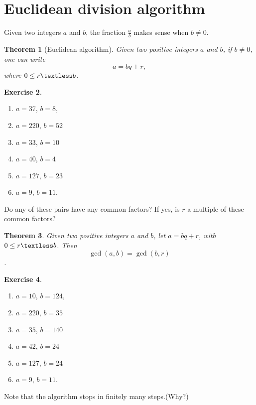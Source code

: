 \documentclass[12pt]{amsart}
\newtheorem{theorem}{Theorem}[section]
\theoremstyle{definition}
\newtheorem{xca}[theorem]{Exercise}
\theoremstyle{remark}
\numberwithin{equation}{section}
\begin{document}
\section{Euclidean division algorithm}

Given two integers $a$ and $b$, the fraction $\frac{a}{b}$ makes sense when $b\neq 0$. 
\begin{theorem}[Euclidean algorithm]
Given two positive integers $a$ and $b$, if $b\neq 0$, one can write  \[ a=bq+r,\] where $0\leq r\textless b$.
\end{theorem}
\begin{xca}
\begin{enumerate} Practice at using the algorithm for the following set of numbers, and find $q$ and $r$ as above:
\item $a= 37$, $b= 8 $,
\item $a= 220$, $b=52 $
\item $a=33 $, $b= 10 $
\item $a= 40$, $b= 4$
\item $a= 127$, $b=23 $
\item $a=9 $, $b= 11 $.
\end{enumerate}
Do any of these pairs have any common factors? If yes, is $r$ a multiple of these common factors?
\end{xca}


\begin{theorem}
Given two positive integers $a$ and $b$, let $ a=bq+r$, with $0\leq r\textless b$. Then \[\gcd(a,b)=\gcd(b,r)\].
\end{theorem}

\begin{xca}
\begin{enumerate} Find the gcd of these two 
\item $a= 10$, $b=124 $,
\item $a= 220$, $b=35 $
\item $a=35 $, $b= 140 $
\item $a= 42$, $b= 24$
\item $a= 127$, $b=24 $
\item $a=9 $, $b= 11 $.
\end{enumerate}
\end{xca}

Note that the algorithm stops in finitely many steps.(Why?)
\end{document}

